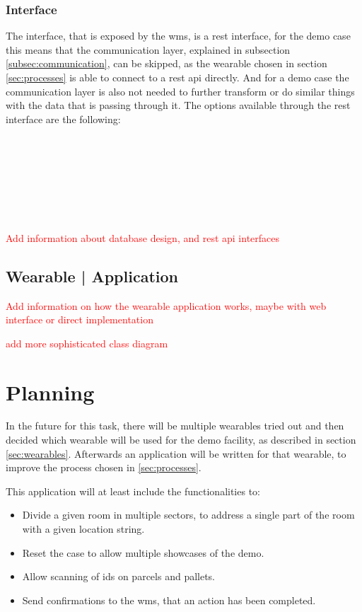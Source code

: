 \subsubsection{Interface}
The interface, that is exposed by the \gls{wms}, is a \gls{rest} interface, for the demo case this means that the communication layer, explained in subsection \ref{subsec:communication}, can be skipped, as the wearable chosen in section \ref{sec:processes} is able to connect to a \gls{rest} \gls{api} directly. And for a demo case the communication layer is also not needed to further transform or do similar things with the data that is passing through it. The options available through the \gls{rest} interface are the following:
\begin{description}
	\item[] \hfill \\
	\item[] \hfill \\
	\item[] \hfill \\
	\item[] \hfill \\
\end{description}


\textcolor{red}{Add information about database design, and rest api interfaces}


\subsection{Wearable | Application}
\textcolor{red}{Add information on how the wearable application works, maybe with web interface or direct implementation}

\textcolor{red}{add more sophisticated class diagram}

\section{Planning}
In the future for this task, there will be multiple wearables tried out and then decided which wearable will be used for the demo facility, as described in section \ref{sec:wearables}. Afterwards an application will be written for that wearable, to improve the process chosen in \ref{sec:processes}. 

This application will at least include the functionalities to:
\begin{itemize}
	\item Divide a given room in multiple sectors, to address a single part of the room with a given location string.
	\item Reset the case to allow multiple showcases of the demo.
	\item Allow scanning of \gls{id}s on \gls{parcel}s and pallets.
	\item Send confirmations to the \gls{wms}, that an action has been completed.
\end{itemize}

